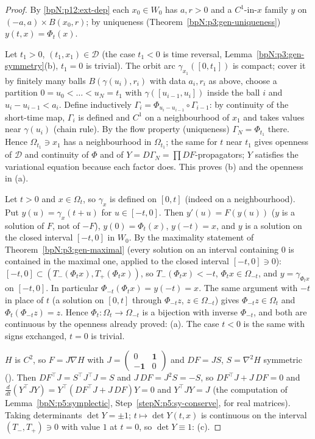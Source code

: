 \begin{proof}
\label{stepN:p12:fl-short} By \ref{bpN:p12:ext-dep} each $x_0\in W_0$ has $a,r>0$ and a $C^1$-in-$x$ family $y$ on $(-a,a)\times B(x_0,r)$; by uniqueness (Theorem~\ref{bpN:p3:gen-uniqueness}) $y(t,x)=\Phi_t(x)$.

\label{stepN:p12:fl-chain} Let $t_1>0$, $(t_1,x_1)\in\mathcal D$ (the case $t_1<0$ is time reversal, Lemma~\ref{bpN:p3:gen-symmetry}(b), $t_1=0$ is trivial). The orbit arc $\gamma_{x_1}([0,t_1])$ is compact; cover it by finitely many balls $B(\gamma(u_i),r_i)$ with data $a_i,r_i$ as above, choose a partition $0=u_0<\dots<u_N=t_1$ with $\gamma([u_{i-1},u_i])$ inside the ball $i$ and $u_i-u_{i-1}<a_i$. Define inductively $\Gamma_i=\Phi_{u_i-u_{i-1}}\circ\Gamma_{i-1}$: by continuity of the short-time map, $\Gamma_i$ is defined and $C^1$ on a neighbourhood of $x_1$ and takes values near $\gamma(u_i)$ (chain rule). By the flow property (uniqueness) $\Gamma_N=\Phi_{t_1}$ there. Hence $\Omega_{t_1}\ni x_1$ has a neighbourhood in $\Omega_{t_1}$; the same for $t$ near $t_1$ gives openness of $\mathcal D$ and continuity of $\Phi$ and of $Y=D\Gamma_N=\prod DF$-propagators; $Y$ satisfies the variational equation because each factor does. This proves (b) and the openness in (a).

\label{stepN:p12:fl-inverse} Let $t>0$ and $x\in\Omega_t$, so $\gamma_x$ is defined on $[0,t]$ (indeed on a neighbourhood). Put $y(u)=\gamma_x(t+u)$ for $u\in[-t,0]$. Then $y'(u)=F(y(u))$ ($y$ is a solution of $F$, not of $-F$), $y(0)=\Phi_t(x)$, $y(-t)=x$, and $y$ is a solution on the closed interval $[-t,0]$ in $W_0$. By the maximality statement of Theorem~\ref{bpN:p3:gen-maximal} (every solution on an interval containing $0$ is contained in the maximal one, applied to the closed interval $[-t,0]\ni0$): $[-t,0]\subset(T_-(\Phi_tx),T_+(\Phi_tx))$, so $T_-(\Phi_tx)<-t$, $\Phi_tx\in\Omega_{-t}$, and $y=\gamma_{\Phi_tx}$ on $[-t,0]$. In particular $\Phi_{-t}(\Phi_tx)=y(-t)=x$. The same argument with $-t$ in place of $t$ (a solution on $[0,t]$ through $\Phi_{-t}z$, $z\in\Omega_{-t}$) gives $\Phi_{-t}z\in\Omega_t$ and $\Phi_t(\Phi_{-t}z)=z$. Hence $\Phi_t:\Omega_t\to\Omega_{-t}$ is a bijection with inverse $\Phi_{-t}$, and both are continuous by the openness already proved: (a). The case $t<0$ is the same with signs exchanged, $t=0$ is trivial.

\label{stepN:p12:fl-symp} $H$ is $C^2$, so $F=J\nabla H$ with $J=\begin{pmatrix}0&\mathbf 1\\-\mathbf 1&0\end{pmatrix}$ and $DF=JS$, $S=\nabla^2H$ symmetric (). Then $DF^\top J=S^\top J^\top J=S$ and $J\,DF=J^2S=-S$, so $DF^\top J+J\,DF=0$ and $\frac d{dt}(Y^\top JY)=Y^\top(DF^\top J+J\,DF)Y=0$ and $Y^\top JY=J$ (the computation of Lemma~\ref{bpN:p5:symplectic}, Step~\ref{stepN:p5:sy-conserve}, for real matrices). Taking determinants $\det Y=\pm1$; $t\mapsto\det Y(t,x)$ is continuous on the interval $(T_-,T_+)\ni0$ with value $1$ at $t=0$, so $\det Y\equiv1$: (c).


\end{proof}
